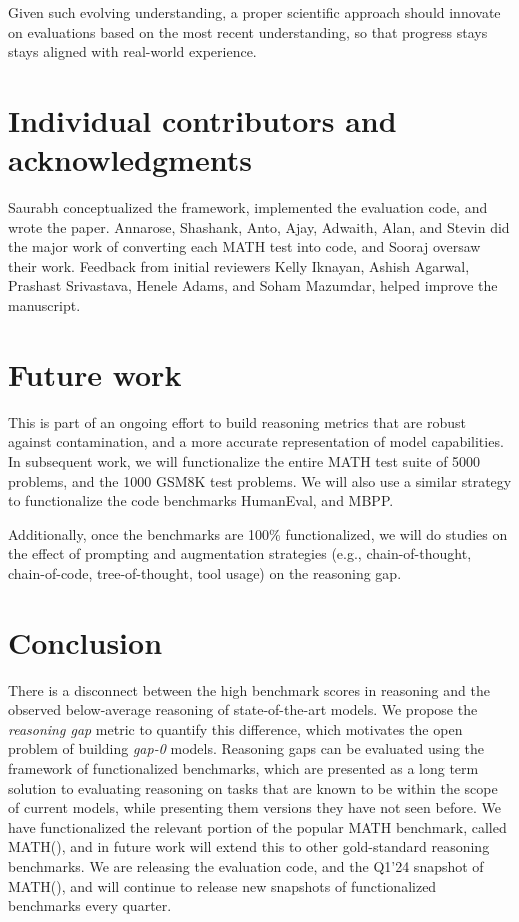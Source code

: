 \documentclass[11pt,a4paper]{article}
\begin{document}
Given such evolving understanding, a proper scientific approach should
innovate on evaluations based on the most recent understanding,
so that progress stays stays aligned with real-world experience.



\section{Individual contributors and acknowledgments}
Saurabh conceptualized the framework, implemented the evaluation code, and wrote the paper. 
Annarose, Shashank, Anto, Ajay, Adwaith, Alan, and Stevin did the major work of converting each
MATH test into code, and Sooraj oversaw their work.
Feedback from initial reviewers Kelly Iknayan, Ashish Agarwal, Prashast
Srivastava, Henele Adams, and Soham Mazumdar, helped improve the manuscript.

\section{Future work}
This is part of an ongoing effort to build reasoning metrics that are robust against contamination, and a more accurate representation of model capabilities. In subsequent work, we will functionalize the entire MATH test suite of 5000 problems, and the 1000 GSM8K test problems. We will also use a similar strategy to functionalize the code benchmarks HumanEval, and MBPP.

Additionally, once the benchmarks are 100\% functionalized, we will do studies on the effect of prompting and augmentation strategies (e.g., chain-of-thought, chain-of-code, tree-of-thought, tool usage) on the reasoning gap.

\section{Conclusion}
There is a disconnect between the high benchmark scores in reasoning and the observed below-average reasoning of state-of-the-art models. We propose the {\em reasoning gap} metric to quantify this difference, which motivates the open problem of building {\em gap-0} models. Reasoning gaps can be evaluated using the framework of functionalized benchmarks, which are presented as a long term solution to evaluating reasoning on tasks that are known to be within the scope of current models, while presenting them versions they have not seen before. We have functionalized the relevant portion of the popular MATH benchmark, called MATH(), and in future work will extend this to other gold-standard reasoning benchmarks. We are releasing the evaluation code, and the Q1'24 snapshot of MATH(), and will continue to release new snapshots of functionalized benchmarks every quarter.
\end{document}
